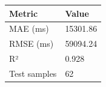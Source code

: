 \begin{tabular}{ll}
\toprule
Metric & Value \\
\midrule
MAE (ms) & 15301.86 \\
RMSE (ms) & 59094.24 \\
R² & 0.928 \\
Test samples & 62 \\
\bottomrule
\end{tabular}
